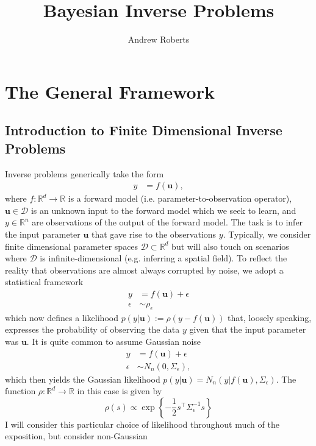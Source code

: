 \documentclass[12pt]{article}
\title{Bayesian Inverse Problems}
\author{Andrew Roberts}
\newcommand{\bpar}{\mathbf{u}} %
\newcommand{\R}{\mathbb{R}}
\begin{document}
\maketitle
\tableofcontents
\newpage

\section{The General Framework}

\subsection{Introduction to Finite Dimensional Inverse Problems}
Inverse problems generically take the form
\begin{align}
y &= f(\bpar),
\end{align}
where $f: \R^d \to \R$ is a forward model (i.e. parameter-to-observation operator), $\bpar \in \mathcal{D}$ is an unknown input to the forward model which we seek to learn, and
$y \in \R^n$ are observations of the output of the forward model. The task is to infer the input parameter $\bpar$ that gave rise to the observations $y$. Typically, we consider finite
dimensional parameter spaces $\mathcal{D} \subset \R^d$ but will also touch on scenarios where $\mathcal{D}$ is infinite-dimensional (e.g. inferring a spatial field). 
To reflect the reality that 
observations are almost always corrupted by noise, we adopt a statistical framework
\begin{align}
y &= f(\bpar) + \epsilon \label{inverse_problem_statistical} \\
\epsilon &\sim \rho_\epsilon \nonumber
\end{align}
which now defines a likelihood $p(y|\bpar) := \rho(y - f(\bpar))$ that, loosely speaking, expresses the probability of observing the data $y$ given that the input parameter was $\bpar$. It is quite common
to assume Gaussian noise 
\begin{align}
y &= f(\bpar) + \epsilon \label{inverse_problem_statistical_Gaussian} \\
\epsilon &\sim N_n(0, \Sigma_\epsilon) \nonumber,
\end{align}
which then yields the Gaussian likelihood $p(y|\bpar) = N_n(y|f(\bpar), \Sigma_\epsilon)$. The function $\rho: \R^d \to \R$ in this case is given by 
\[\rho(s) \propto \exp\left\{-\frac{1}{2} s^{\top} \Sigma_{\epsilon}^{-1} s \right\}\]
 I will consider this particular choice of likelihood throughout much of the exposition, but consider non-Gaussian 
\end{document}
